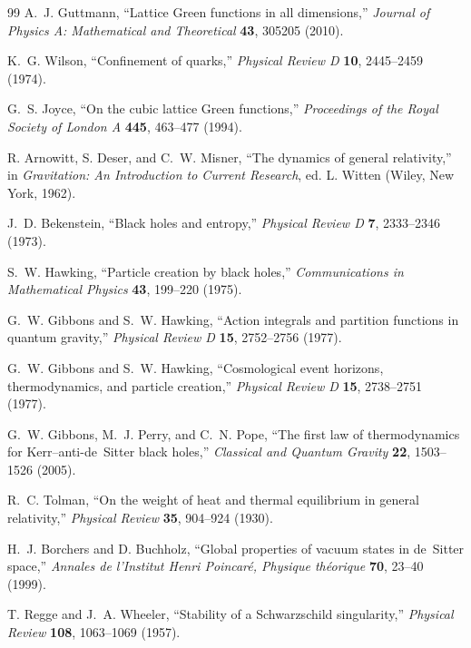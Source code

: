 \documentclass[11pt]{article}
\begin{document}
\begin{thebibliography}{99}
A.~J. Guttmann,
``Lattice Green functions in all dimensions,''
\emph{Journal of Physics A: Mathematical and Theoretical} \textbf{43}, 305205 (2010).

K.~G. Wilson,
``Confinement of quarks,''
\emph{Physical Review D} \textbf{10}, 2445--2459 (1974).

G.~S. Joyce,
``On the cubic lattice Green functions,''
\emph{Proceedings of the Royal Society of London A} \textbf{445}, 463--477 (1994).

R. Arnowitt, S. Deser, and C.~W. Misner,
``The dynamics of general relativity,''
in \emph{Gravitation: An Introduction to Current Research},
ed. L. Witten (Wiley, New York, 1962).

J.~D. Bekenstein,
``Black holes and entropy,''
\emph{Physical Review D} \textbf{7}, 2333--2346 (1973).

S.~W. Hawking,
``Particle creation by black holes,''
\emph{Communications in Mathematical Physics} \textbf{43}, 199--220 (1975).

G.~W. Gibbons and S.~W. Hawking,
``Action integrals and partition functions in quantum gravity,''
\emph{Physical Review D} \textbf{15}, 2752--2756 (1977).

G.~W. Gibbons and S.~W. Hawking,
``Cosmological event horizons, thermodynamics, and particle creation,''
\emph{Physical Review D} \textbf{15}, 2738--2751 (1977).

G.~W. Gibbons, M.~J. Perry, and C.~N. Pope,
``The first law of thermodynamics for Kerr--anti-de~Sitter black holes,''
\emph{Classical and Quantum Gravity} \textbf{22}, 1503--1526 (2005).

R.~C. Tolman,
``On the weight of heat and thermal equilibrium in general relativity,''
\emph{Physical Review} \textbf{35}, 904--924 (1930).

H.~J. Borchers and D. Buchholz,
``Global properties of vacuum states in de~Sitter space,''
\emph{Annales de l'Institut Henri Poincar\'e, Physique th\'eorique} \textbf{70}, 23--40 (1999).

T. Regge and J.~A. Wheeler,
``Stability of a Schwarzschild singularity,''
\emph{Physical Review} \textbf{108}, 1063--1069 (1957).


\end{thebibliography}
\end{document}
